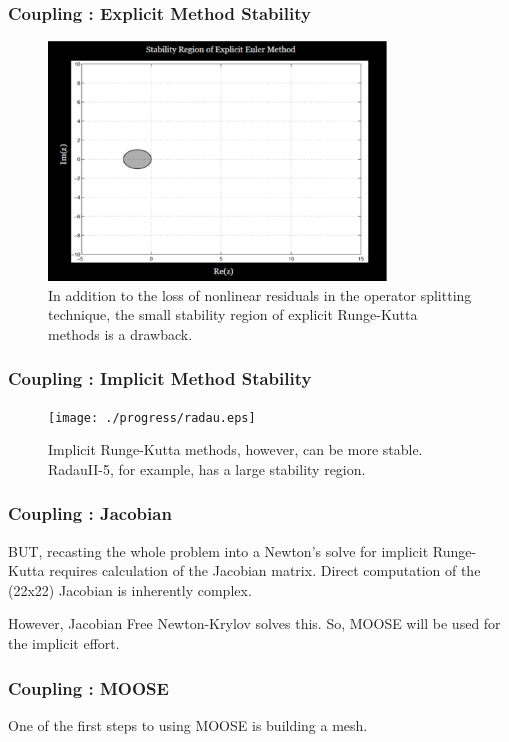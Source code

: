 \begin{frame}[fragile]
  \frametitle{Coupling : Explicit Method Stability}
  \begin{figure}[htbp!]
    \begin{center}
      \includegraphics[width=0.8\textwidth]{./progress/euler.eps}
    \end{center}
    \caption{In addition to the loss of nonlinear residuals in the operator 
    splitting technique, the small stability region of explicit Runge-Kutta methods is 
  a drawback.}
    \label{fig:euler_stability}
  \end{figure}

\end{frame}

\begin{frame}[fragile]
  \frametitle{Coupling : Implicit Method Stability}
  \begin{figure}[htbp!]
    \begin{center}
      \texttt{[image: ./progress/radau.eps]}
    \end{center}
    \caption{Implicit Runge-Kutta methods, however, can be more stable. RadauII-5, for example, has a large stability region.}
    \label{fig:radau_stability}
  \end{figure}

\end{frame}


\begin{frame}[fragile]
  \frametitle{Coupling : Jacobian}
BUT, recasting the whole problem into a Newton's solve for implicit Runge-Kutta
requires calculation of the Jacobian matrix. Direct computation of the (22x22)
Jacobian is inherently complex. 

However, Jacobian Free Newton-Krylov solves this. So, MOOSE will be used for
the implicit effort.

\end{frame}


\begin{frame}[fragile]
  \frametitle{Coupling : MOOSE}
  One of the first steps to using MOOSE is building a mesh.
\end{frame}

